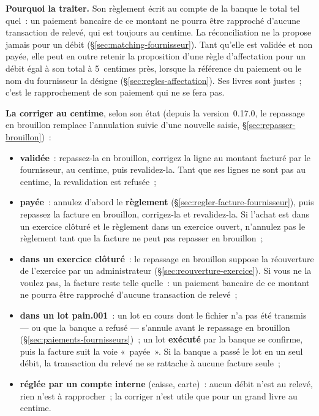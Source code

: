 \documentclass[a4paper,11pt,oneside]{article}
\begin{document}
\textbf{Pourquoi la traiter.} Son règlement écrit au compte de la banque le total tel quel~:
un paiement bancaire de ce montant ne pourra être rapproché d'aucune transaction de relevé, qui
est toujours au centime. La réconciliation ne la propose jamais pour un débit
(\S\ref{sec:matching-fournisseur}). Tant qu'elle est validée et non payée, elle peut en outre retenir la
proposition d'une règle d'affectation pour un débit égal à son total à 5~centimes près, lorsque
la référence du paiement ou le nom du fournisseur la désigne (\S\ref{sec:regles-affectation}).
Ses livres sont justes~; c'est le rapprochement de son paiement qui ne se fera pas.

\textbf{La corriger au centime}, selon son état (depuis la version~0.17.0, le repassage en
brouillon remplace l'annulation suivie d'une nouvelle saisie, \S\ref{sec:repasser-brouillon})~:
\begin{itemize}
    \item \textbf{validée}~: repassez-la en brouillon, corrigez la ligne au montant facturé par le
          fournisseur, au centime, puis revalidez-la. Tant que ses lignes ne sont pas au centime,
          la revalidation est refusée~;
    \item \textbf{payée}~: annulez d'abord le \textbf{règlement}
          (\S\ref{sec:regler-facture-fournisseur}), puis repassez la facture en brouillon,
          corrigez-la et revalidez-la. Si l'achat est dans un exercice clôturé et le règlement
          dans un exercice ouvert, n'annulez pas le règlement tant que la facture ne peut pas
          repasser en brouillon~;
    \item \textbf{dans un exercice clôturé}~: le repassage en brouillon suppose la réouverture de l'exercice
          par un administrateur (\S\ref{sec:reouverture-exercice}). Si vous ne la voulez pas, la
          facture reste telle quelle~: un paiement bancaire de ce montant ne pourra être rapproché
          d'aucune transaction de relevé~;
    \item \textbf{dans un lot pain.001}~: un lot en cours dont le fichier n'a pas été transmis
          --- ou que la banque a refusé --- s'annule avant le repassage en brouillon (\S\ref{sec:paiements-fournisseurs})~;
          un lot \textbf{exécuté} par la banque se confirme, puis la facture suit la voie
          «~payée~». Si la banque a passé le lot en un seul débit, la transaction du relevé ne se
          rattache à aucune facture seule~;
    \item \textbf{réglée par un compte interne} (caisse, carte)~: aucun débit n'est au relevé, rien
          n'est à rapprocher~; la corriger n'est utile que pour un grand livre au centime.
\end{itemize}
\end{document}
